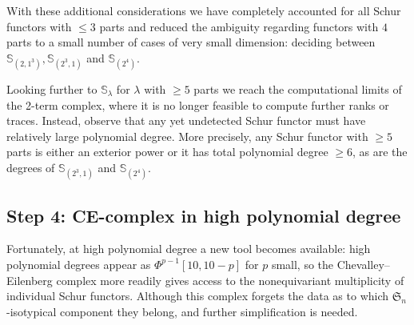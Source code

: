 \documentclass[12pt]{article}
\newcommand{\SymGroup}[1][n]{\mathfrak{S}_{#1}}
\newcommand{\Schur}[1]{\mathbb{S}_{#1}}
\theoremstyle{plain}
\theoremstyle{definition}
\theoremstyle{remark}
\begin{document}
\begin{itemize}


\end{itemize}

With these additional considerations we have completely accounted for all Schur functors with $\leq 3$ parts and reduced the ambiguity regarding functors with $4$ parts to a small number of cases of very small dimension: deciding between $\Schur{(2,1^3)}, \Schur{(2^3,1)}$ and $\Schur{(2^4)}$. 

Looking further to $\Schur{\lambda}$ for $\lambda$ with $\geq 5$ parts we reach the computational limits of the 2-term complex, where it is no longer feasible to compute further ranks or traces. Instead, observe that any yet undetected Schur functor must have relatively large polynomial degree. More precisely, any Schur functor with $\geq 5$ parts is either an exterior power or it has total polynomial degree $\geq 6$, as are the degrees of $\Schur{(2^3,1)}$ and $\Schur{(2^4)}$.


\subsection*{Step 4: CE-complex in high polynomial degree}

Fortunately, at high polynomial degree a new tool becomes available: high polynomial degrees appear as $\Phi^{p-1}[10,10-p]$ for $p$ small, so the Chevalley--Eilenberg complex more readily gives access to the nonequivariant multiplicity of individual Schur functors. Although this complex forgets the data as to which $\SymGroup$-isotypical component they belong, and further simplification is needed.
\end{document}
